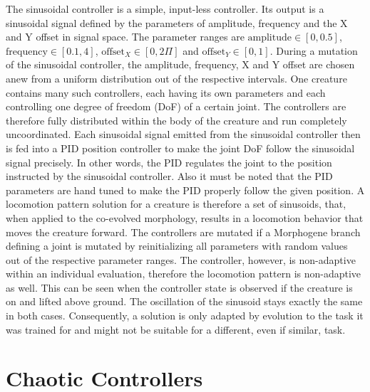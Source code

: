 \documentclass[main]{subfiles}
\begin{document}
The sinusoidal controller is a simple, input-less controller. %
%
Its output is a sinusoidal signal defined by the parameters of amplitude, frequency and the X and Y offset in signal space. %
%
The parameter ranges are $\text{amplitude} \in [0,0.5]$, $\text{frequency} \in [0.1,4]$, $\text{offset}_X \in [0,2\Pi]$ and $\text{offset}_Y \in [0,1]$. %
%
During a mutation of the sinusoidal controller, the amplitude, frequency, X and Y offset are chosen anew from a uniform distribution out of the respective intervals. %
%
One creature contains many such controllers, each having its own parameters and each controlling one degree of freedom (DoF) of a certain joint. %
%
The controllers are therefore fully distributed within the body of the creature and run completely uncoordinated. %
%
Each sinusoidal signal emitted from the sinusoidal controller then is fed into a PID position controller to make the joint DoF follow the sinusoidal signal precisely. %
%
In other words, the PID regulates the joint to the position instructed by the sinusoidal controller. %
%
Also it must be noted that the PID parameters are hand tuned to make the PID properly follow the given position. %
%
A locomotion pattern solution for a creature is therefore a set of sinusoids, that, when applied to the co-evolved morphology, results in a locomotion behavior that moves the creature forward. %
%
The controllers are mutated if a Morphogene branch defining a joint is mutated by reinitializing all parameters with random values out of the respective parameter ranges. %
%
The controller, however, is non-adaptive within an individual evaluation, therefore the locomotion pattern is non-adaptive as well. %
%
This can be seen when the controller state is observed if the creature is on and lifted above ground. %
%
The oscillation of the sinusoid stays exactly the same in both cases. %
%
Consequently, a solution is only adapted by evolution to the task it was trained for and might not be suitable for a different, even if similar, task.

\section{Chaotic Controllers}
\label{sec:chaotic-controllers}
\end{document}
